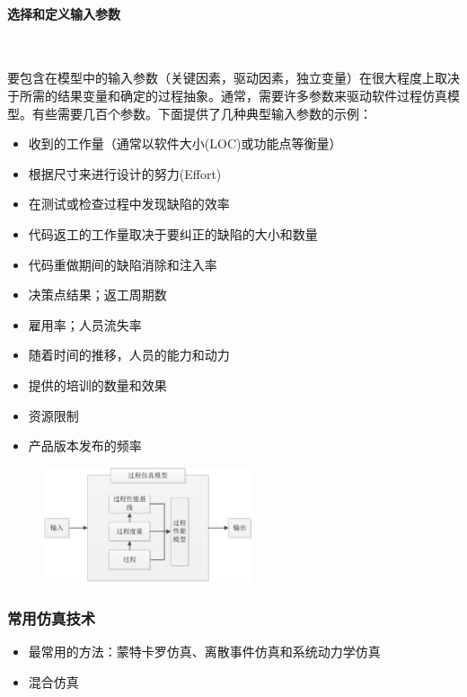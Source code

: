 \paragraph*{选择和定义输入参数}~{} \par
要包含在模型中的输入参数（关键因素，驱动因素，独立变量）在很大程度上取决于所需的结果变量和确定的过程抽象。通常，需要许多参数来驱动软件过程仿真模型。有些需要几百个参数。下面提供了几种典型输入参数的示例：
\vspace{-0.8em}
\begin{multicols}{2}
    \begin{itemize}
        \item 收到的工作量（通常以软件大小(LOC)或功能点等衡量）
        \item 根据尺寸来进行设计的努力(Effort)
        \item 在测试或检查过程中发现缺陷的效率
        \item 代码返工的工作量取决于要纠正的缺陷的大小和数量
        \item 代码重做期间的缺陷消除和注入率
        \item 决策点结果；返工周期数
        \item 雇用率；人员流失率
        \item 随着时间的推移，人员的能力和动力
        \item 提供的培训的数量和效果
        \item 资源限制
        \item 产品版本发布的频率
    \end{itemize}
\end{multicols}
\vspace{-1em}

\begin{figure}[H]
    \vspace{-0.5em}
	\centering
	\includegraphics[width=0.55\textwidth]{images/过程仿真模型构成要素之间的关系图.png}
    \vspace{-1em}
\end{figure}

\subsubsection{常用仿真技术}
\begin{itemize}
    \item 最常用的方法：蒙特卡罗仿真、离散事件仿真和系统动力学仿真
    \item 混合仿真
\end{itemize}

